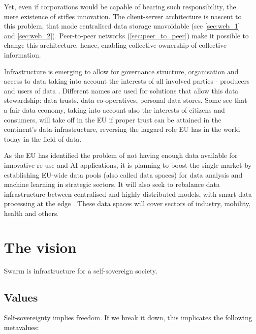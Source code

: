 Yet, even if corporations would be capable of bearing such responsibility, the mere existence of  stifles innovation. The client-server architecture is nascent to this problem, that made centralised data storage unavoidable (see \ref{sec:web_1} and \ref{sec:web_2}). Peer-to-peer networks (\ref{sec:peer_to_peer}) make it possible to change this architecture, hence, enabling collective ownership of collective information. 

Infrastructure is emerging to allow for governance structure, organisation and access to data taking into account the interests of all involved parties - producers and users of data \cite{DigitalPlurality2020Feb}. Different names are used for solutions that allow this data stewardship: data trusts, data co-operatives, personal data stores. Some see that a fair data economy, taking into account also the interests of citizens and consumers, will take off in the EU if proper trust can be attained in the continent's data infrastructure, reversing the laggard role EU has in the world today in the field of data. 

As the EU has identified the problem of not having enough data available for innovative re-use and AI applications, it is planning to boost the single market by establishing EU-wide data pools (also called data spaces) for data analysis and machine learning in strategic sectors. It will also seek to rebalance data infrastructure between centralised and highly distributed models,  with smart data processing at the edge \cite{EUDataStrategy2020Feb}. These data spaces will cover sectors of industry, mobility, health and others. 


\section{The vision  \statusorange}\label{sec:vision}


\begin{displayquote}
Swarm is infrastructure for a self-sovereign society. 
\end{displayquote}


\subsection{Values \statusorange}\label{sec:values}

Self-sovereignty implies freedom. If we break it down, this implicates the following metavalues: 

